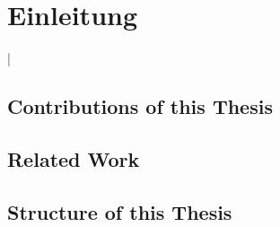 \documentclass[german,version-2020-11]{uzl-thesis}
\begin{document}
%
%


\chapter{Einleitung}%


%

\lstMakeShortInline[style=code,style=inline,language={[LaTeX]tex},moretexcs={chapter}]|



\section{Contributions of this Thesis}



\section{Related Work}


\section{Structure of this Thesis}
\end{document}
